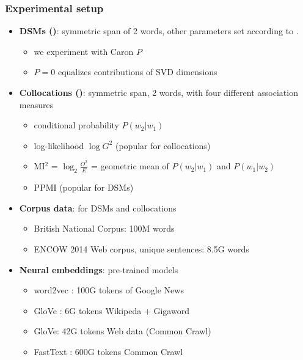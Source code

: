 \documentclass[t]{beamer} %
\begin{document}
\begin{frame}
  \frametitle{Experimental setup}

  \ungap[1]
  \begin{itemize}\small
  \item<1-> \textbf{DSMs ()}: symmetric span of 2  words, other parameters set according to \citet{Lapesa:Evert:14a}.
    \begin{itemize}\footnotesize
    \item we experiment with Caron $P$ \citep{Bullinaria:Levy:12}
    \item $P = 0$ equalizes contributions of SVD dimensions
    \end{itemize}

  \item<2-> \textbf{Collocations ()}: symmetric span, 2  words,
    with four different association measures \citep{Evert:08}
    \begin{itemize}\footnotesize
    \item conditional probability $P(w_2|w_1)$
    \item log-likelihood $\log G^2$ (popular for collocations)
    \item MI$^2$ = $\log_2 \frac{O^2}{E}$ = geometric mean of $P(w_2|w_1)$ and $P(w_1|w_2)$
    \item PPMI (popular for DSMs)
    \end{itemize}
    
  \item<3-> \textbf{Corpus data}: for DSMs and collocations
    \begin{itemize}\footnotesize
    \item British National Corpus: 100M words
    \item ENCOW 2014 Web corpus, unique sentences: 8.5G words
    \end{itemize}
    
  \item<4-> \textbf{Neural embeddings}: pre-trained models
    \begin{itemize}\footnotesize
    \item word2vec \citep{Mikolov:etc:13}: 100G tokens of Google News
    \item GloVe \citep{Pennington:Socher:Manning:14}: 6G tokens Wikipeda + Gigaword
    \item GloVe: 42G tokens Web data (Common Crawl)
    \item FastText \citep{Joulin:etc:17}: 600G tokens Common Crawl
    \end{itemize}
  \end{itemize} 
\end{frame}
\end{document}
